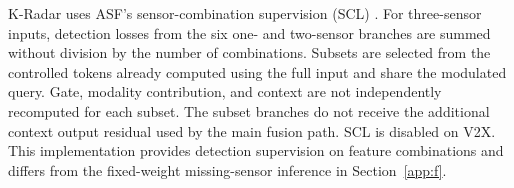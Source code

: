 K-Radar uses ASF's sensor-combination supervision (SCL) \citep{paek2025asf}. For three-sensor inputs, detection losses from the six one- and two-sensor branches are summed without division by the number of combinations. Subsets are selected from the controlled tokens already computed using the full input and share the modulated query. Gate, modality contribution, and context are not independently recomputed for each subset. The subset branches do not receive the additional context output residual used by the main fusion path. SCL is disabled on V2X. This implementation provides detection supervision on feature combinations and differs from the fixed-weight missing-sensor inference in Section~\ref{app:f}.







